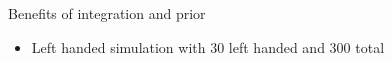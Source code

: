 \documentclass[english,t]{beamer}
\begin{document}
\begin{frame}{Benefits of integration and prior}

  \begin{itemize}
  \item Left handed simulation with 30 left handed and 300 total
  \end{itemize}
  

\end{frame}
\end{document}
